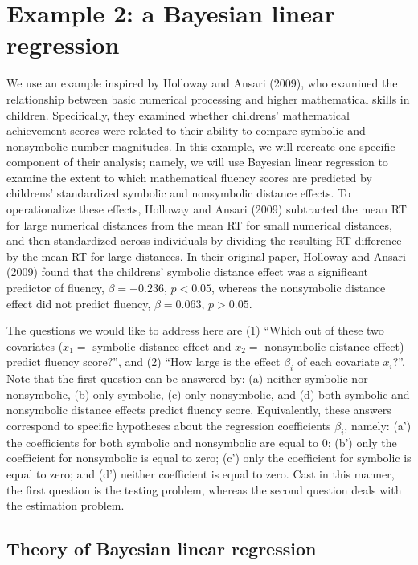 \documentclass[english,,doc,floatsintext]{apa6}
\begin{document}
\hypertarget{example-2-a-bayesian-linear-regression}{%
\section{Example 2: a Bayesian linear regression}\label{example-2-a-bayesian-linear-regression}}

We use an example inspired by Holloway and Ansari (2009), who examined the relationship between basic numerical processing and higher mathematical skills in children. Specifically, they examined whether childrens' mathematical achievement scores were related to their ability to compare symbolic and nonsymbolic number magnitudes. In this example, we will recreate one specific component of their analysis; namely, we will use Bayesian linear regression to examine the extent to which mathematical fluency scores are predicted by childrens' standardized symbolic and nonsymbolic distance effects. To operationalize these effects, Holloway and Ansari (2009) subtracted the mean RT for large numerical distances from the mean RT for small numerical distances, and then standardized across individuals by dividing the resulting RT difference by the mean RT for large distances.
In their original paper, Holloway and Ansari (2009) found that the childrens' symbolic distance effect was a significant predictor of fluency, \(\beta = -0.236\), \(p<0.05\), whereas the nonsymbolic distance effect did not predict fluency, \(\beta=0.063\), \(p > 0.05\).

The questions we would like to address here are (1) \enquote{Which out of these two covariates (\(x_{1}=\text{ symbolic distance effect}\) and \(x_{2}=\text{ nonsymbolic distance effect}\)) predict fluency score?}, and (2) \enquote{How large is the effect \(\beta_{i}\) of each covariate \(x_{i}\)?}. Note that the first question can be answered by: (a) neither symbolic nor nonsymbolic, (b) only symbolic, (c) only nonsymbolic, and (d) both symbolic and nonsymbolic distance effects predict fluency score. Equivalently, these answers correspond to specific hypotheses about the regression coefficients \(\beta_{i}\), namely: (a') the coefficients for both symbolic and nonsymbolic are equal to 0; (b') only the coefficient for nonsymbolic is equal to zero; (c') only the coefficient for symbolic is equal to zero; and (d') neither coefficient is equal to zero. Cast in this manner, the first question is the testing problem, whereas the second question deals with the estimation problem.

\hypertarget{theory-of-bayesian-linear-regression}{%
\subsection{Theory of Bayesian linear regression}\label{theory-of-bayesian-linear-regression}}
\end{document}
